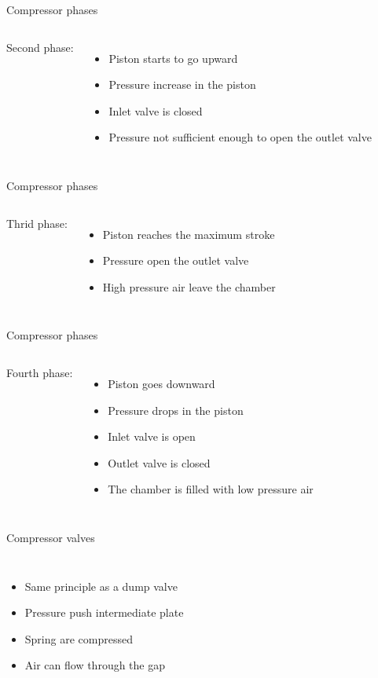 \documentclass[aspectratio=1610,english,12pt]{beamer}
\begin{document}
	\begin{frame}{Compressor phases}
		\begin{columns}[onlytextwidth]
				Second phase:
				\begin{itemize}
					\item Piston starts to go upward
					\item Pressure increase in the piston
					\item Inlet valve is closed
					\item Pressure not sufficient enough to open the outlet valve
				\end{itemize}
		\end{columns}
	\end{frame}

	\begin{frame}{Compressor phases}
		\begin{columns}[onlytextwidth]
				Thrid phase:
				\begin{itemize}
					\item Piston reaches the maximum stroke
					\item Pressure open the outlet valve
					\item High pressure air leave the chamber
				\end{itemize}
		\end{columns}
	\end{frame}

	\begin{frame}{Compressor phases}
		\begin{columns}[onlytextwidth]
				Fourth phase:
				\begin{itemize}
					\item Piston goes downward
					\item Pressure drops in the piston
					\item Inlet valve is open
					\item Outlet valve is closed
					\item The chamber is filled with low pressure air
				\end{itemize}
		\end{columns}
	\end{frame}

	\begin{frame}{Compressor valves}
		\begin{columns}[onlytextwidth]
				\begin{itemize}
					\item Same principle as a dump valve
					\item Pressure push intermediate plate
					\item Spring are compressed
					\item Air can flow through the gap
				\end{itemize}
		\end{columns}
	\end{frame}
\end{document}
